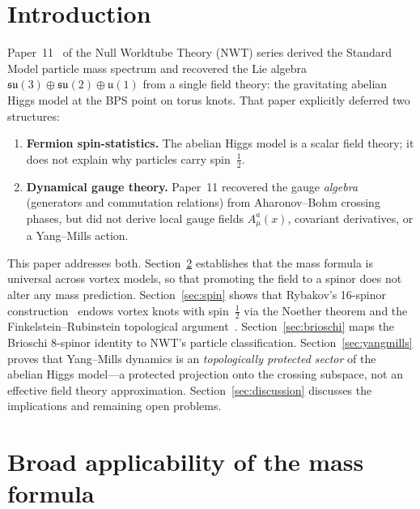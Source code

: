 \documentclass[11pt]{article}
\newcommand{\su}{\mathfrak{su}}
\newcommand{\uu}{\mathfrak{u}}
\newcommand{\half}{\tfrac{1}{2}}
\begin{document}
\section{Introduction}
\label{sec:intro}

Paper~11~\cite{NWT11} of the Null Worldtube Theory (NWT) series derived
the Standard Model particle mass spectrum and recovered the Lie algebra
$\su(3) \oplus \su(2) \oplus \uu(1)$ from a single field theory: the
gravitating abelian Higgs model at the BPS point on torus knots.  That
paper explicitly deferred two structures:
\begin{enumerate}
\item \textbf{Fermion spin-statistics.}  The abelian Higgs model is a
      scalar field theory; it does not explain why particles carry
      spin~$\half$.
\item \textbf{Dynamical gauge theory.}  Paper~11 recovered the gauge
      \emph{algebra} (generators and commutation relations) from
      Aharonov--Bohm crossing phases, but did not derive local gauge
      fields $A_\mu^a(x)$, covariant derivatives, or a Yang--Mills
      action.
\end{enumerate}

This paper addresses both.  Section~\ref{sec:universality} establishes
that the mass formula is universal across vortex models, so that
promoting the field to a spinor does not alter any mass prediction.
Section~\ref{sec:spin} shows that Rybakov's 16-spinor
construction~\cite{Rybakov2016} endows vortex knots with spin~$\half$
via the Noether theorem and the Finkelstein--Rubinstein topological
argument~\cite{FR1968}.  Section~\ref{sec:brioschi} maps the Brioschi
8-spinor identity to NWT's particle classification.
Section~\ref{sec:yangmills} proves that Yang--Mills dynamics is an
\emph{topologically protected sector} of the abelian Higgs model---a
protected projection onto the crossing subspace, not an effective
field theory approximation.  Section~\ref{sec:discussion} discusses
the implications and remaining open problems.


\section{Broad applicability of the mass formula}
\label{sec:universality}
\end{document}
